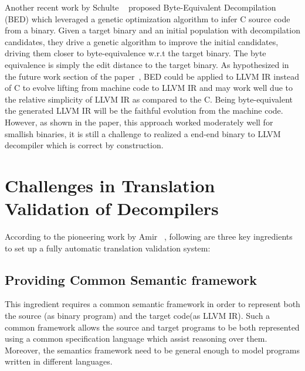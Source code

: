 Another recent work by Schulte \etal~\cite{eschulte2018bed} proposed
Byte-Equivalent Decompilation (BED) which leveraged a genetic optimization
algorithm to infer C source code from a binary. Given a target binary and an
initial population with decompilation candidates, they  drive a genetic
algorithm to improve the initial candidates, driving them closer to
byte-equivalence w.r.t the target binary. The byte equivalence  is simply the
edit distance to the target binary. As hypothesized in the future work section
of the paper~\cite{eschulte2018bed}, BED could be applied to LLVM IR instead of
C to evolve lifting from machine code to LLVM IR and may work well due to the
relative simplicity of LLVM IR as compared to the C. Being byte-equivalent the
generated LLVM IR will be the faithful evolution from the machine code.
However, as shown in the paper, this approach worked moderately well for
smallish binaries, it is still a challenge to realized a end-end binary to LLVM
decompiler which is correct by construction.

\section{Challenges in Translation Validation of Decompilers}\label{sec:challenges}
According to the pioneering work by Amir \etal~\cite{Pnueli:1998}, following
are three key ingredients to set up a fully automatic translation validation
system:

\subsection{Providing Common Semantic framework} This ingredient requires a
common semantic framework in order to represent both the source (as \ISA binary
    program) and the target code(as LLVM IR). Such a common framework allows
the source and target programs to be both represented using a common
specification language which assist reasoning over them. Moreover, the
semantics framework need to be general enough to model programs written in
different languages.

